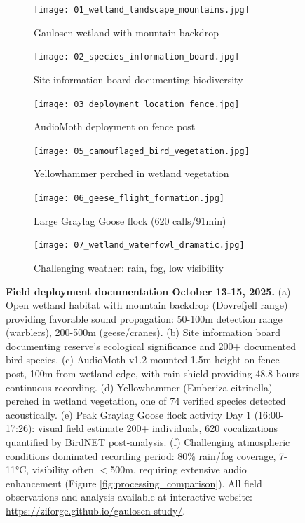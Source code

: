 \documentclass[twocolumn]{article}
\begin{document}
\begin{figure}[h]
\centering
\begin{subfigure}{0.31\textwidth}
\centering
\texttt{[image: 01\_wetland\_landscape\_mountains.jpg]}
\caption{Gaulosen wetland with mountain backdrop}
\end{subfigure}
\hfill
\begin{subfigure}{0.31\textwidth}
\centering
\texttt{[image: 02\_species\_information\_board.jpg]}
\caption{Site information board documenting biodiversity}
\end{subfigure}
\hfill
\begin{subfigure}{0.31\textwidth}
\centering
\texttt{[image: 03\_deployment\_location\_fence.jpg]}
\caption{AudioMoth deployment on fence post}
\end{subfigure}

\vspace{0.3cm}

\begin{subfigure}{0.31\textwidth}
\centering
\texttt{[image: 05\_camouflaged\_bird\_vegetation.jpg]}
\caption{Yellowhammer perched in wetland vegetation}
\end{subfigure}
\hfill
\begin{subfigure}{0.31\textwidth}
\centering
\texttt{[image: 06\_geese\_flight\_formation.jpg]}
\caption{Large Graylag Goose flock (620 calls/91min)}
\end{subfigure}
\hfill
\begin{subfigure}{0.31\textwidth}
\centering
\texttt{[image: 07\_wetland\_waterfowl\_dramatic.jpg]}
\caption{Challenging weather: rain, fog, low visibility}
\end{subfigure}

\caption{\textbf{Field deployment documentation October 13-15, 2025.} (a) Open wetland habitat with mountain backdrop (Dovrefjell range) providing favorable sound propagation: 50-100m detection range (warblers), 200-500m (geese/cranes). (b) Site information board documenting reserve's ecological significance and 200+ documented bird species. (c) AudioMoth v1.2 mounted 1.5m height on fence post, 100m from wetland edge, with rain shield providing 48.8 hours continuous recording. (d) Yellowhammer (Emberiza citrinella) perched in wetland vegetation, one of 74 verified species detected acoustically. (e) Peak Graylag Goose flock activity Day 1 (16:00-17:26): visual field estimate 200+ individuals, 620 vocalizations quantified by BirdNET post-analysis. (f) Challenging atmospheric conditions dominated recording period: 80\% rain/fog coverage, 7-11°C, visibility often $<$500m, requiring extensive audio enhancement (Figure \ref{fig:processing_comparison}). All field observations and analysis available at interactive website: \url{https://ziforge.github.io/gaulosen-study/}.}
\label{fig:field_deployment}
\end{figure}
\end{document}
